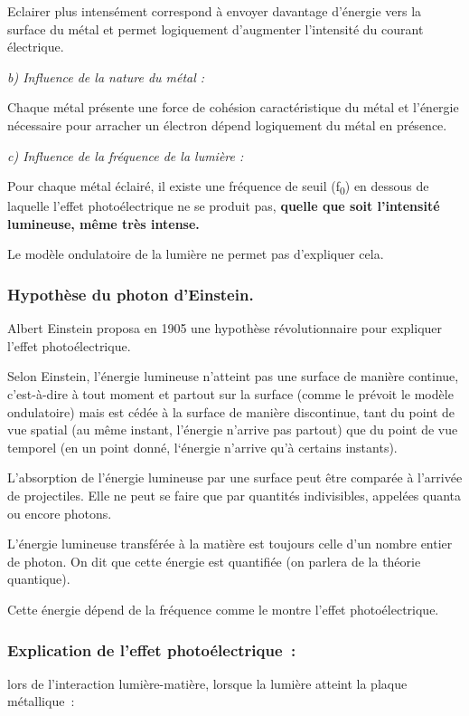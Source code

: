 Eclairer plus intensément correspond à envoyer davantage d'énergie vers
la surface du métal et permet logiquement d'augmenter l'intensité du
courant électrique.

\emph{b) Influence de la nature du métal :}

Chaque métal présente une force de cohésion caractéristique du métal et
l'énergie nécessaire pour arracher un électron dépend logiquement du
métal en présence.

\emph{c) Influence de la fréquence de la lumière :}

Pour chaque métal éclairé, il existe une fréquence de seuil
(f\textsubscript{0}) en dessous de laquelle l'effet photoélectrique ne
se produit pas, \textbf{quelle que soit l'intensité lumineuse, même très
intense.}

Le modèle ondulatoire de la lumière ne permet pas d'expliquer cela.
\subsubsection{Hypothèse du photon d'Einstein. }

Albert Einstein proposa en 1905 une hypothèse révolutionnaire pour
expliquer l'effet photoélectrique.

Selon Einstein, l'énergie lumineuse n'atteint pas une surface de manière
continue, c'est-à-dire à tout moment et partout sur la surface (comme le
prévoit le modèle ondulatoire) mais est cédée à la surface de manière
discontinue, tant du point de vue spatial (au même instant, l'énergie
n'arrive pas partout) que du point de vue temporel (en un point donné,
l`énergie n'arrive qu'à certains instants).

L'absorption de l'énergie lumineuse par une surface peut être comparée à
l'arrivée de projectiles. Elle ne peut se faire que par quantités
indivisibles, appelées quanta ou encore photons.

L'énergie lumineuse transférée à la matière est toujours celle d'un
nombre entier de photon. On dit que cette énergie est quantifiée (on
parlera de la théorie quantique).

Cette énergie dépend de la fréquence comme le montre l'effet
photoélectrique.

\subsubsection{Explication de l'effet photoélectrique~:} lors de
l'interaction lumière-matière, lorsque la lumière atteint la plaque
métallique~:

